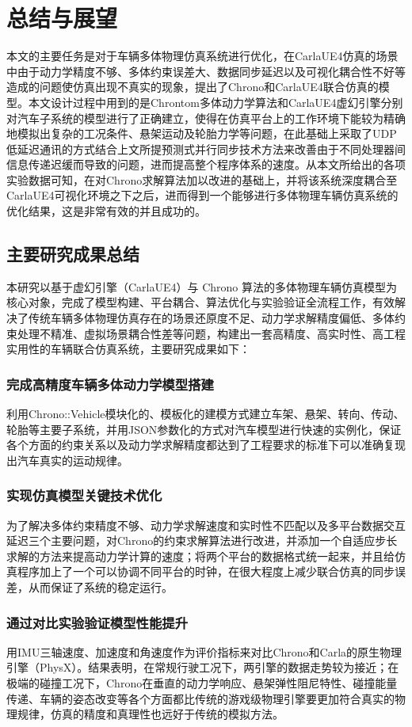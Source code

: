 \chapter{总结与展望}

本文的主要任务是对于车辆多体物理仿真系统进行优化，在CarlaUE4仿真的场景中由于动力学精度不够、多体约束误差大、数据同步延迟以及可视化耦合性不好等造成的问题使仿真出现不真实的现象，提出了Chrono和CarlaUE4联合仿真的模型。本文设计过程中用到的是Chrontom多体动力学算法和CarlaUE4虚幻引擎分别对汽车子系统的模型进行了正确建立，使得在仿真平台上的工作环境下能较为精确地模拟出复杂的工况条件、悬架运动及轮胎力学等问题，在此基础上采取了UDP低延迟通讯的方式结合上文所提预测式并行同步技术方法来改善由于不同处理器间信息传递迟缓而导致的问题，进而提高整个程序体系的速度。从本文所给出的各项实验数据可知，在对Chrono求解算法加以改进的基础上，并将该系统深度耦合至CarlaUE4可视化环境之下之后，进而得到一个能够进行多体物理车辆仿真系统的优化结果，这是非常有效的并且成功的。

\section{主要研究成果总结}

本研究以基于虚幻引擎（CarlaUE4）与 Chrono 算法的多体物理车辆仿真模型为核心对象，完成了模型构建、平台耦合、算法优化与实验验证全流程工作，有效解决了传统车辆多体物理仿真存在的场景还原度不足、动力学求解精度偏低、多体约束处理不精准、虚拟场景耦合性差等问题，构建出一套高精度、高实时性、高工程实用性的车辆联合仿真系统，主要研究成果如下：
\subsection{完成高精度车辆多体动力学模型搭建}
利用Chrono::Vehicle模块化的、模板化的建模方式建立车架、悬架、转向、传动、轮胎等主要子系统，并用JSON参数化的方式对汽车模型进行快速的实例化，保证各个方面的约束关系以及动力学求解精度都达到了工程要求的标准下可以准确复现出汽车真实的运动规律。
\subsection{实现仿真模型关键技术优化}
为了解决多体约束精度不够、动力学求解速度和实时性不匹配以及多平台数据交互延迟三个主要问题，对Chrono的约束求解算法进行改进，并添加一个自适应步长求解的方法来提高动力学计算的速度；将两个平台的数据格式统一起来，并且给仿真程序加上了一个可以协调不同平台的时钟，在很大程度上减少联合仿真的同步误差，从而保证了系统的稳定运行。
\subsection{通过对比实验验证模型性能提升}
用IMU三轴速度、加速度和角速度作为评价指标来对比Chrono和Carla的原生物理引擎（PhysX）。结果表明，在常规行驶工况下，两引擎的数据走势较为接近；在极端的碰撞工况下，Chrono在垂直的动力学响应、悬架弹性阻尼特性、碰撞能量传递、车辆的姿态改变等各个方面都比传统的游戏级物理引擎要更加符合真实的物理规律，仿真的精度和真理性也远好于传统的模拟方法。
